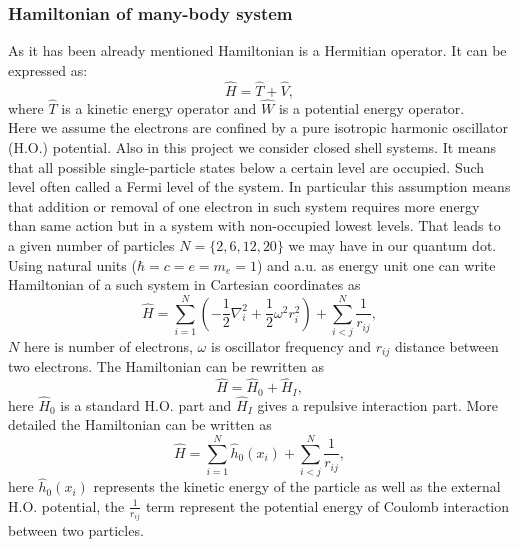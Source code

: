 \documentclass[twoside,english]{uiofysmaster}
\theoremstyle{definition}
\begin{document}
\subsubsection{Hamiltonian of many-body system}
As it has been already mentioned Hamiltonian is a Hermitian operator. It can be expressed as:
\begin{equation}
\hat{H}=\hat{T}+\hat{V},
\end{equation}
where $\hat{T}$ is a kinetic energy operator and $\hat{W}$ is a potential energy operator. \\
Here we assume the electrons are confined by a pure isotropic harmonic oscillator (H.O.) potential. Also in this project we consider closed shell systems. It means that all possible single-particle states below a certain level are occupied. Such level often called a Fermi level of the system. In particular this assumption means that addition or removal of one electron in such system requires more energy than same action but in a system with non-occupied lowest levels. That leads to a given number of particles $N = \{2, 6, 12, 20\}$ we may have in our quantum dot. 
Using natural units ($\hbar=c=e=m_e=1$) and a.u. as energy unit one can write Hamiltonian of a such system in Cartesian coordinates as
\begin{equation}
\label{eq:finalH}
\hat{H}=\sum_{i=1}^{N} \left(  -\frac{1}{2} \nabla_i^2 + \frac{1}{2} \omega^2r_i^2  \right)+\sum_{i<j}^{N}\frac{1}{r_{ij}},
\end{equation}
$N$ here is number of electrons, $\omega$ is oscillator frequency and $r_{ij}$ distance between two electrons. The Hamiltonian can be rewritten as
\begin{equation}
\hat{H}=\hat{H}_0+\hat{H}_I ,
\end{equation}
here $\hat{H}_0$ is a standard H.O. part and $\hat{H}_I$ gives a repulsive interaction part. 
More detailed the Hamiltonian can be written as 
\begin{equation}
\hat{H} = \sum_{i=1}^{N}\hat{h}_0(x_i) + \sum_{i < j}^{N}\frac{1}{r_{ij}},
\label{H1H2}
\end{equation}
here $ \hat{h}_0(x_i) $ represents the kinetic energy of the particle as well as the external H.O. potential, the $\frac{1}{r_{ij}}$ term represent the potential energy of Coulomb interaction between two particles. 
\end{document}
